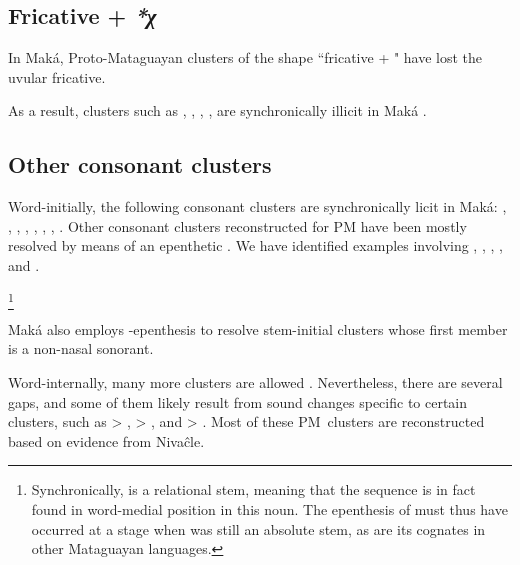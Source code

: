 \subsection{Fricative + \textit{*χ}}\label{mk-fricative-dorsal}
In Maká, Proto-Mataguayan clusters of the shape ``fricative + " have lost the uvular fricative.

\begin{exe}
    \ex \finger
    \ex \redquebracho
    \ex \thunder
    \ex \meat
\end{exe}

As a result, clusters such as , , , ,  are synchronically illicit in Maká \citep[60–61]{AG89}.

\subsection{Other consonant clusters}\label{mk-clusters}

Word-initially, the following consonant clusters are synchronically licit in Maká: , , , , , , ,  \citep[58]{AG89}. Other consonant clusters reconstructed for PM have been mostly resolved by means of an epenthetic . We have identified examples involving , , , , and .

\begin{exe}
    \ex \palm
    \ex \sleepiness\footnote{Synchronically,  is a relational stem, meaning that the sequence  is in fact found in word-medial position in this noun. The epenthesis of  must thus have occurred at a stage when  was still an absolute stem, as are its cognates in other Mataguayan languages.}
    \ex \cavy
    \ex \whitequebracho
    \ex \spring
\end{exe}

Maká also employs \mbox{-}epenthesis to resolve stem-initial clusters whose first member is a non-nasal sonorant.

\begin{exe}
    \ex \flu
    \ex \squash
    \ex \rib
\end{exe}

Word-internally, many more clusters are allowed \citep[59–63]{AG89}. Nevertheless, there are several gaps, and some of them likely result from sound changes specific to certain clusters, such as  > ,  > , and  > . Most of these PM~clusters are reconstructed based on evidence from Nivaĉle.


